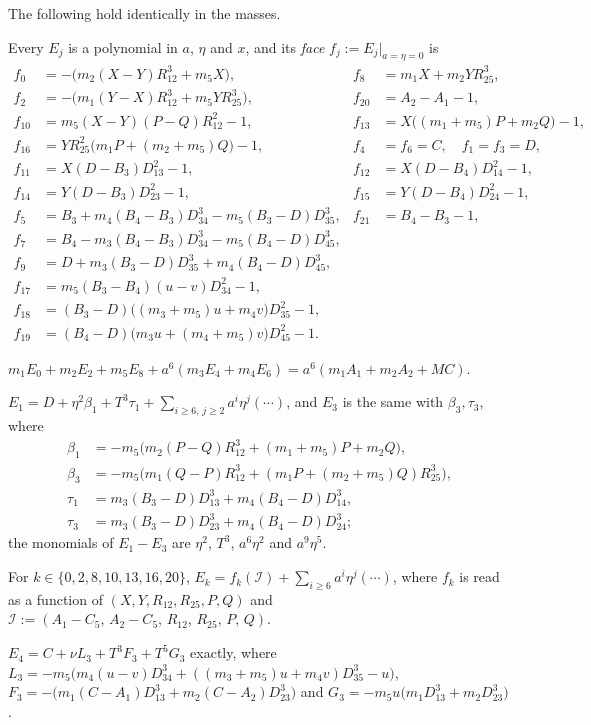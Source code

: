 \begin{lemma}\label{lem:d8-rows}
The following hold identically in the masses.
\begin{romanlist}
\item Every $E_j$ is a polynomial in $a$, $\eta$ and $x$, and its \emph{face}
$f_j:=E_j|_{a=\eta=0}$ is
\begin{align*}
  f_0&=-\bigl(m_2(X-Y)R_{12}^3+m_5X\bigr), & f_8&=m_1X+m_2YR_{25}^3,\\
  f_2&=-\bigl(m_1(Y-X)R_{12}^3+m_5YR_{25}^3\bigr), & f_{20}&=A_2-A_1-1,\\
  f_{10}&=m_5(X-Y)(P-Q)R_{12}^2-1, & f_{13}&=X\bigl((m_1+m_5)P+m_2Q\bigr)-1,\\
  f_{16}&=YR_{25}^2\bigl(m_1P+(m_2+m_5)Q\bigr)-1, & f_4&=f_6=C,\quad f_1=f_3=D,\\
  f_{11}&=X(D-B_3)D_{13}^2-1, & f_{12}&=X(D-B_4)D_{14}^2-1,\\
  f_{14}&=Y(D-B_3)D_{23}^2-1, & f_{15}&=Y(D-B_4)D_{24}^2-1,\\
  f_5&=B_3+m_4(B_4-B_3)D_{34}^3-m_5(B_3-D)D_{35}^3, & f_{21}&=B_4-B_3-1,\\
  f_7&=B_4-m_3(B_4-B_3)D_{34}^3-m_5(B_4-D)D_{45}^3,\\
  f_9&=D+m_3(B_3-D)D_{35}^3+m_4(B_4-D)D_{45}^3,\\
  f_{17}&=m_5(B_3-B_4)(u-v)D_{34}^2-1,\\
  f_{18}&=(B_3-D)\bigl((m_3+m_5)u+m_4v\bigr)D_{35}^2-1,\\
  f_{19}&=(B_4-D)\bigl(m_3u+(m_4+m_5)v\bigr)D_{45}^2-1.
\end{align*}
\item $m_1E_0+m_2E_2+m_5E_8+a^6(m_3E_4+m_4E_6)=a^6(m_1A_1+m_2A_2+MC)$.
\item $E_1=D+\eta^2\beta_1+T^3\tau_1+\sum_{i\ge6,\,j\ge2}a^i\eta^j(\cdots)$, and $E_3$ is the
same with $\beta_3,\tau_3$, where
\begin{align*}
  \beta_1&=-m_5\bigl(m_2(P-Q)R_{12}^3+(m_1+m_5)P+m_2Q\bigr),\\
  \beta_3&=-m_5\bigl(m_1(Q-P)R_{12}^3+(m_1P+(m_2+m_5)Q)R_{25}^3\bigr),\\
  \tau_1&=m_3(B_3-D)D_{13}^3+m_4(B_4-D)D_{14}^3,\\
  \tau_3&=m_3(B_3-D)D_{23}^3+m_4(B_4-D)D_{24}^3;
\end{align*}
the monomials of $E_1-E_3$ are $\eta^2$, $T^3$, $a^6\eta^2$ and $a^9\eta^5$.
\item For $k\in\{0,2,8,10,13,16,20\}$, $E_k=f_k(\mathcal I)+\sum_{i\ge6}a^i\eta^j(\cdots)$, where
$f_k$ is read as a function of $(X,Y,R_{12},R_{25},P,Q)$ and
$\mathcal I:=(A_1-C_5,\,A_2-C_5,\,R_{12},\,R_{25},\,P,\,Q)$.
\item $E_4=C+\nu L_3+T^3F_3+T^5G_3$ exactly, where
$L_3=-m_5\bigl(m_4(u-v)D_{34}^3+((m_3+m_5)u+m_4v)D_{35}^3-u\bigr)$,
$F_3=-\bigl(m_1(C-A_1)D_{13}^3+m_2(C-A_2)D_{23}^3\bigr)$ and
$G_3=-m_5u\bigl(m_1D_{13}^3+m_2D_{23}^3\bigr)$.
\end{romanlist}
\end{lemma}
